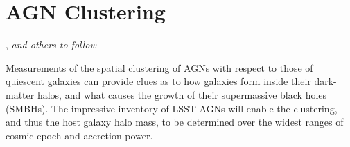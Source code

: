 %
%
%
%
%
%
%

\section{AGN Clustering}
\def\secname{\chpname:clustering}\label{sec:\secname}

,
{\it and others to follow}



Measurements of the spatial clustering of AGNs with respect
to those of quiescent galaxies can provide clues as to how galaxies
form inside their dark-matter halos, and what causes the growth of
their supermassive black holes (SMBHs). The impressive inventory of
LSST AGNs will enable the clustering, and thus the host galaxy halo
mass, to be determined over the widest ranges of cosmic epoch
and accretion power.



